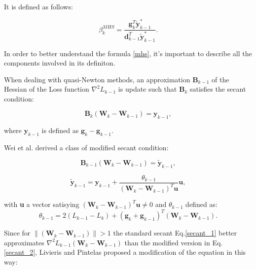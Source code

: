 			It is defined as follows:

			\begin{equation}
			\label{mhs}
 				 \beta^{MHS}_k = \frac{\mathbf{g}_k^T \widetilde{\textbf{y}}_{k-1}^*}{\mathbf{d}_{k-1}^T\widetilde{\textbf{y}}_{k-1}^*}.
			\end{equation}

			In order to better understand the formula \ref{mhs}, it's important to describe all the components involved in its definiton.

			When dealing with quasi-Newton methods, an approximation $\textbf{B}_{k-1}$ of the Hessian of the Loss function $\nabla^2\textit{L}_{k-1}$ is update such that $\textbf{B}_k$ satisfies the secant condition:

			\begin{equation}
			\label{secant_1}
 				\textbf{B}_k (\textbf{W}_k - \textbf{W}_{k-1}) = \textbf{y}_{k-1},
 			\end{equation}

 			where $\textbf{y}_{k-1}$ is defined as $\textbf{g}_k - \textbf{g}_{k-1}$.

 			Wei et al. \cite{Zengxi-2006} derived a class of modified secant condition:

			\begin{equation}
			\label{secant_2}
 				\textbf{B}_{k-1} (\textbf{W}_k - \textbf{W}_{k-1}) = \widetilde{\textbf{y}}_{k-1},
 			\end{equation}


			\begin{equation}
			\label{secant_2}
 			 \widetilde{\textbf{y}}_{k-1} =  \textbf{y}_{k-1} + \frac{\theta_{k-1}}{(\textbf{W}_k - \textbf{W}_{k-1})^T\textbf{u}}\textbf{u},
 			\end{equation}

 			with \textbf{u} a vector satisying $(\textbf{W}_k - \textbf{W}_{k-1})^T\textbf{u} \neq 0$ and $\theta_{k-1}$ defined as:
 			\begin{equation}
			\label{theta}
 			 \theta_{k-1} = 2(\textit{L}_{k-1} - \textit{L}_{k}) + (\textbf{g}_k + \textbf{g}_{k-1})^T(\textbf{W}_k - \textbf{W}_{k-1}).
 			\end{equation}


 			Since for $\|(\textbf{W}_k - \textbf{W}_{k-1})\| > 1$ the standard secant Eq.\ref{secant_1} better approximates $\nabla^2\textit{L}_{k-1}(\textbf{W}_k - \textbf{W}_{k-1})$ than the modified version in Eq.\ref{secant_2}, Livieris and Pintelas\cite{LIVIERIS2013491} proposed a modification of the equation in this way:

